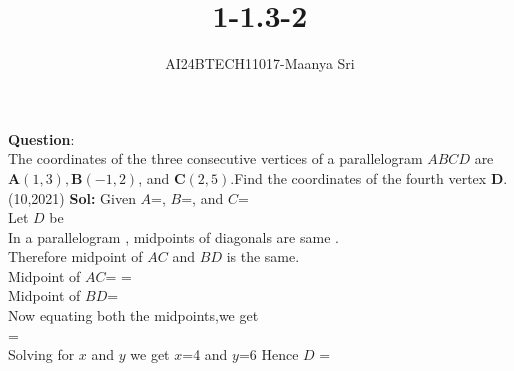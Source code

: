 \documentclass[journal]{IEEEtran}
\begin{document}

\vspace{3cm}

\title{1-1.3-2}
\author{AI24BTECH11017-Maanya Sri
}
{\let\newpage\relax\maketitle}

\renewcommand{\thefigure}{\theenumi}
\renewcommand{\thetable}{\theenumi}
\setlength{\intextsep}{10pt} %


\renewcommand{\thetable}{\theenumi}
\textbf{Question}:\\
The coordinates of the three consecutive vertices of a parallelogram $ABCD$ are $\textbf{A} (1,3), \textbf{B}(-1,2)$, and $\textbf{C}(2,5)$.Find the coordinates of the fourth vertex \textbf{D}.
\hfill(10,2021)
\textbf{Sol:}
\newline Given $A$=,
$B$=, and
$C$=
\\ Let $D$ be 
\\ In a parallelogram , midpoints of diagonals are same .
\\ Therefore midpoint of $AC$ and $BD$ is the same.
\\ Midpoint of $AC$= = 
\\ Midpoint of $BD$=
\\ Now equating both the midpoints,we get
\\  = 
\\ Solving for $x$ and $y$ we get $x$=4 and $y$=6
Hence $D$ = 
\end{document}

